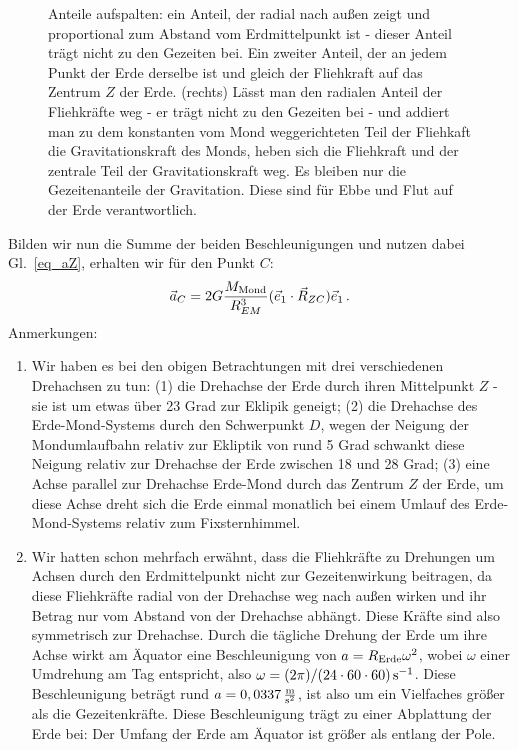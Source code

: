 \begin{figure}[htb]
{Anteile aufspalten: ein Anteil, der radial nach au\ss en zeigt und proportional zum Abstand vom
Erdmittelpunkt ist - dieser Anteil tr\"agt nicht zu den Gezeiten bei. Ein zweiter Anteil, der an jedem
Punkt der Erde derselbe ist und gleich der Fliehkraft auf das Zentrum $Z$ der Erde.
(rechts) L\"asst man den radialen Anteil der Fliehkr\"afte weg - er tr\"agt nicht zu den Gezeiten bei - 
und addiert man zu dem konstanten vom Mond weggerichteten Teil der Fliehkaft die
Gravitationskraft des Monds, heben sich die Fliehkraft und der zentrale Teil der Gravitationskraft
weg. Es bleiben nur die Gezeitenanteile der Gravitation. Diese sind f\"ur Ebbe und Flut auf der
Erde verantwortlich.}
\end{figure}

Bilden wir nun die Summe der beiden Beschleunigungen und nutzen dabei Gl.~\ref{eq_aZ},
erhalten wir f\"ur den Punkt $C$:
\begin{equation}
         \vec{a}_C =   2 G \frac{M_{\rm Mond}}{R_{EM}^3}  (\vec{e}_1 \cdot \vec{R}_{ZC}) \vec{e}_1 \, .
\end{equation} 
Anmerkungen:
\begin{enumerate}
\item
Wir haben es bei den obigen Betrachtungen mit drei verschiedenen Drehachsen zu tun:
(1) die Drehachse der Erde durch ihren Mittelpunkt $Z$ - sie ist um etwas \"uber 23 Grad zur
Eklipik geneigt; (2) die Drehachse des Erde-Mond-Systems durch den Schwerpunkt $D$, wegen
der Neigung der Mondumlaufbahn 
relativ zur Ekliptik von rund 5 Grad schwankt diese Neigung
relativ zur Drehachse der Erde zwischen 18 und 28 Grad; (3) eine Achse parallel
zur Drehachse Erde-Mond durch das Zentrum $Z$ der Erde, um diese Achse dreht sich die
Erde einmal monatlich bei einem Umlauf des Erde-Mond-Systems relativ zum Fixsternhimmel.
\item  
Wir hatten schon mehrfach erw\"ahnt, dass die Fliehkr\"afte zu Drehungen um Achsen durch
den Erdmittelpunkt nicht zur Gezeitenwirkung beitragen, da diese Fliehkr\"afte radial von der
Drehachse weg nach au\ss en wirken und ihr Betrag nur vom Abstand von der Drehachse
abh\"angt. Diese Kr\"afte sind also symmetrisch zur Drehachse.
Durch die t\"agliche Drehung der Erde um ihre Achse wirkt am
\"Aquator eine Beschleunigung von $a=R_{\rm Erde} \omega^2$, wobei $\omega$ einer Umdrehung
am Tag entspricht, also
$\omega=(2\pi)/(24\cdot 60\cdot 60)\,{\rm s}^{-1}$. Diese Beschleunigung betr\"agt rund
$a=0,0337\,\frac{\rm m}{{\rm s}^2}$, ist also um ein Vielfaches gr\"o\ss er als die Gezeitenkr\"afte. 
Diese Beschleunigung tr\"agt zu einer Abplattung der Erde bei: Der Umfang der Erde am 
\"Aquator ist gr\"o\ss er als entlang der Pole.   
\end{enumerate}

